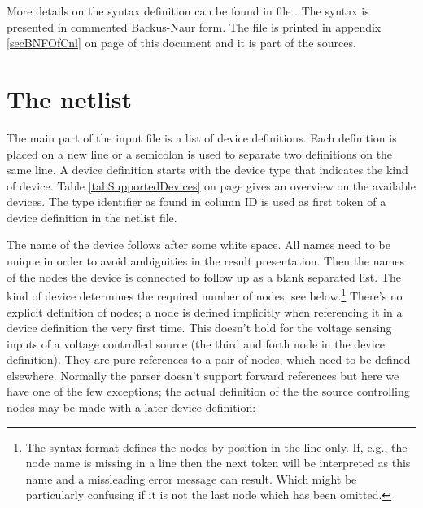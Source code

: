 More details on the syntax definition can be found in file
. The syntax is presented in commented
Backus-Naur form. The file is printed in appendix \ref{secBNFOfCnl} on
page \pageref{secBNFOfCnl} of this document and it is part of the
\linnet{} sources.


\section{The netlist}

The main part of the input file is a list of device definitions. Each
definition is placed on a new line or a semicolon is used to separate two
definitions on the same line. A device definition starts with the device
type that indicates the kind of device. Table \ref{tabSupportedDevices} on
page \pageref{tabSupportedDevices} gives an overview on the available
devices. The type identifier as found in column ID is used as first token
of a device definition in the netlist file.


The name of the device follows after some white space. All names need to
be unique in order to avoid ambiguities in the result presentation. Then
the names of the nodes the device is connected to follow up as a blank
separated list. The kind of device determines the required number of
nodes, see below.\footnote{The syntax format defines the nodes by position
in the line only. If, e.g., the node name is missing in a line then the
next token will be interpreted as this name and a missleading error
message can result. Which might be particularly confusing if it is not the
last node which has been omitted.} There's no explicit definition of
nodes; a node is defined implicitly when referencing it in a device
definition the very first time. This doesn't hold for the voltage sensing
inputs of a voltage controlled source (the third and forth node in the
device definition). They are pure references to a pair of nodes, which
need to be defined elsewhere. Normally the parser doesn't support forward
references but here we have one of the few exceptions; the actual
definition of the the source controlling nodes may be made with a later
device definition:

